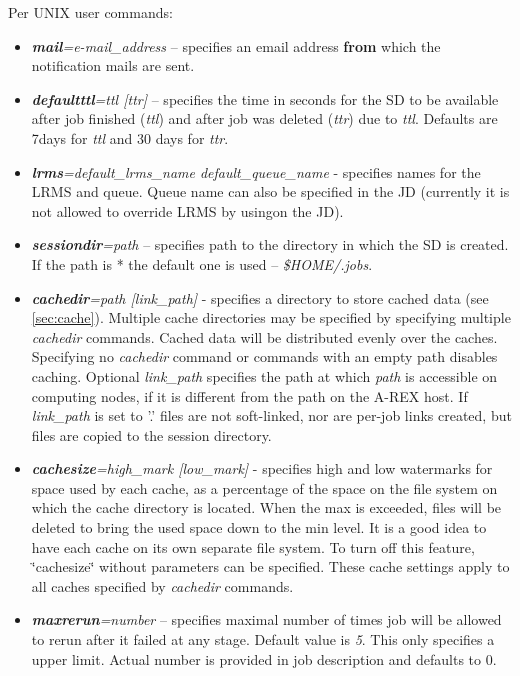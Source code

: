 \documentclass{article}                            %
\begin{document}
Per UNIX user commands:

\begin{itemize}
\item \textbf{\textit{mail}}\textit{=e-mail\_address} -- specifies an email
address \textbf{from} which the notification mails are sent.
\item \textbf{\textit{defaultttl}}\textit{=ttl {[}ttr]} -- specifies the
time in seconds for the SD to be available after job finished (\emph{ttl})
and after job was deleted (\emph{ttr}) due to \emph{ttl}. Defaults
are 7days for \emph{ttl} and 30 days for \emph{ttr}.
\item \textbf{\textit{lrms}}\textit{=default\_lrms\_name default\_queue\_name}
- specifies names for the LRMS and queue. Queue name can also be specified
in the JD (currently it is not allowed to override LRMS by usingon
the JD).
\item \textbf{\textit{sessiondir}}\textit{=path} -- specifies path to the directory
in which the SD is created. If the path is {*} the default one is
used -- \textit{\$HOME/.jobs}.
\item \textbf{\textit{cachedir}}\textit{=path {[}link\_path]} - specifies
a directory to store cached data (see \ref{sec:cache}).\emph{ }Multiple
cache directories may be specified by specifying multiple \emph{cachedir}
commands. Cached data will be distributed evenly over the caches.
Specifying no \emph{cachedir }command or commands with an empty path
disables caching. Optional \textit{link\_path} specifies the path
at which \emph{path} is accessible on computing nodes, if it is different
from the path on the A-REX host. If \textit{link\_path} is set to '.'
files are not soft-linked, nor are per-job links created, but files
are copied to the session directory.
\item \textbf{\textit{cachesize}}\textit{=high\_mark {[}low\_mark]} - specifies
high and low watermarks for space used by each cache, as a percentage
of the space on the file system on which the cache directory is located.
When the max is exceeded, files will be deleted to bring the used
space down to the min level. It is a good idea to have each cache
on its own separate file system. To turn off this feature, \char`\"{}cachesize\char`\"{}
without parameters can be specified. These cache settings apply to
all caches specified by \emph{cachedir} commands.
\item \textbf{\textit{maxrerun}}\textit{=number} -- specifies maximal number
of times job will be allowed to rerun after it failed at any stage.
Default value is \emph{5}. This only specifies a upper limit. Actual
number is provided in job description and defaults to 0.
\end{itemize}
\end{document}

